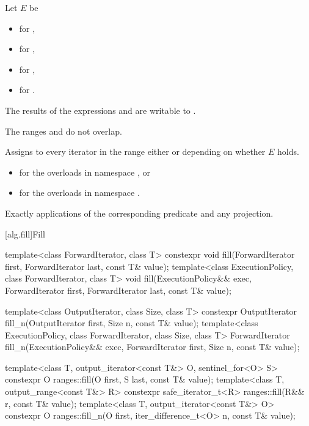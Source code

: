 \begin{itemdescr}
\setlength{\emergencystretch}{1.5em}
\pnum
Let $E$ be
\begin{itemize}
\item {}
  for ,
\item {}
  for ,
\item {}
  for ,
\item {}
  for .
\end{itemize}

\pnum
\mandates
The results of the expressions  and 
are writable to .

\pnum
\expects
The ranges  and 
do not overlap.

\pnum
\effects
Assigns to every iterator 
in the range 
either  or 
depending on whether $E$ holds.

\pnum
\returns
\begin{itemize}
\item
  for the overloads in namespace , or
\item
  for the overloads in namespace .
\end{itemize}

\pnum
\complexity
Exactly  applications
of the corresponding predicate and any projection.
\end{itemdescr}

[alg.fill]{Fill}

%
%
\begin{itemdecl}
template<class ForwardIterator, class T>
  constexpr void fill(ForwardIterator first, ForwardIterator last, const T& value);
template<class ExecutionPolicy, class ForwardIterator, class T>
  void fill(ExecutionPolicy&& exec,
            ForwardIterator first, ForwardIterator last, const T& value);

template<class OutputIterator, class Size, class T>
  constexpr OutputIterator fill_n(OutputIterator first, Size n, const T& value);
template<class ExecutionPolicy, class ForwardIterator, class Size, class T>
  ForwardIterator fill_n(ExecutionPolicy&& exec,
                         ForwardIterator first, Size n, const T& value);


template<class T, output_iterator<const T&> O, sentinel_for<O> S>
  constexpr O ranges::fill(O first, S last, const T& value);
template<class T, output_range<const T&> R>
  constexpr safe_iterator_t<R> ranges::fill(R&& r, const T& value);
template<class T, output_iterator<const T&> O>
  constexpr O ranges::fill_n(O first, iter_difference_t<O> n, const T& value);
\end{itemdecl}


